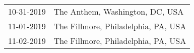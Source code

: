 \begin{supertabular}{ll}
 10-31-2019 &      The Anthem, Washington, DC, USA \\
 11-01-2019 &  The Fillmore, Philadelphia, PA, USA \\
 11-02-2019 &  The Fillmore, Philadelphia, PA, USA \\
\end{supertabular}
